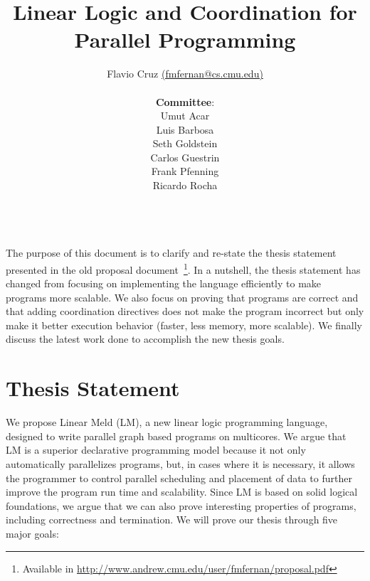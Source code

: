 \documentclass[10pt]{article}
\title{Linear Logic and Coordination for Parallel Programming}
\author{Flavio Cruz \href{mailto:fmfernan@cs.cmu.edu}{(fmfernan@cs.cmu.edu)} \\\\
\textbf{Committee}: \\
Umut Acar\\
Luis Barbosa\\
Seth Goldstein\\
Carlos Guestrin\\
Frank Pfenning\\
Ricardo Rocha\\\
}
\begin{document}
\maketitle

The purpose of this document is to clarify and re-state the thesis statement
presented in the old proposal document~\footnote{Available in
\url{http://www.andrew.cmu.edu/user/fmfernan/proposal.pdf}}.
In a nutshell, the thesis statement has changed from focusing on implementing the
language efficiently to make programs more scalable. We also focus on proving that programs
are correct and that adding coordination directives does not
make the program incorrect but only make it better execution behavior (faster,
      less memory, more scalable).
We finally discuss the latest work done to accomplish the new thesis goals.

\section{Thesis Statement}

We propose Linear Meld (LM), a new linear logic programming language, designed
to write parallel graph based programs on multicores.  We argue that LM is a
superior declarative programming model because it not only automatically
parallelizes programs, but, in cases where it is necessary, it allows the
programmer to control parallel scheduling and placement of data to further
improve the program run time and scalability.  Since LM is based on solid
logical foundations, we argue that we can also prove interesting properties of
programs, including correctness and termination. We will prove our thesis
through five major goals:
\end{document}

